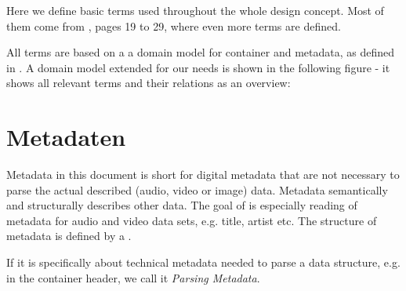 \newcommand{\ISimpleComponentRegistry}{\texttt{ISimple\-Com\-po\-nent\-Re\-gis\-try}}
\newcommand{\IComponentInterface}{\texttt{ICom\-po\-nent\-Inter\-face}}

\newcommand{\ComponentDescription}{Com\-po\-nent\-Descrip\-tion}
\newcommand{\ConfigProp}{\texttt{Abstract\-Con\-fig\-Param}}
\newcommand{\IConfigurable}{\texttt{ICon\-figu\-rable}}
\newcommand{\ConfigurationHandler}{\texttt{Con\-fig\-Hand\-ler}}
\newcommand{\IConfigurationChangeListener}{\texttt{ICon\-fig\-Change\-Listener}}

\newcommand{\SUBSExtension}{\texttt{Extension}}


Here we define basic terms used throughout the whole design concept. Most of them come from \cite{MetaComp}, pages 19 to 29, where even more terms are defined.

All terms are based on a a domain model for container and metadata, as defined in \cite{MetaComp}. A domain model extended for our needs is shown in the following figure - it shows all relevant terms and their relations as an overview:


\section{Metadaten}
\label{sec:Metadata}

Metadata in this document is short for digital metadata that are not necessary to parse the actual described (audio, video or image) data. Metadata semantically and structurally describes other data. The goal of \LibName{} is especially reading of metadata for audio and video data sets, e.g. title, artist etc. The structure of metadata is defined by a \TERMmetadataFormat{}.

If it is specifically about technical metadata needed to parse a data structure, e.g. in the container header,  we call it \emph{Parsing Metadata}.


